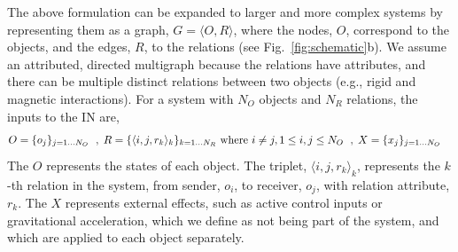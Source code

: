 \documentclass{article}
\newcommand{\NO}{N_O}
\newcommand{\NR}{N_R}
\begin{document}
The above formulation can be expanded to larger and more complex
systems by representing them as a graph, $G = \langle O,R \rangle$,
where the nodes, $O$, correspond to the objects, and the edges, $R$,
to the relations (see Fig.~\ref{fig:schematic}b). We assume an
attributed, directed multigraph because the relations have attributes,
and there can be multiple distinct relations between two objects
(e.g., rigid and magnetic interactions). For a system with $\NO$
objects and $\NR$ relations, the inputs to the IN are,
\begin{equation*}
\begin{aligned}[t]
  O &= \{o_j\}_{j=1\dots\NO}
\end{aligned}\hspace*{-4pt},\;
\begin{aligned}[t]
  R &= \{\langle i, j, r_k \rangle_k\}_{k=1\dots\NR} \mbox{ where } i
  \ne j, 1 \le i,j \le \NO
\end{aligned}\hspace*{-4pt},\;
\begin{aligned}[t]
  X &= \{x_j\}_{j=1\dots\NO}
\end{aligned}
\end{equation*}
The $O$ represents the states of each object. The triplet, $\langle i,
j, r_k \rangle_k$, represents the $k$-th relation in the system, from
sender, $o_i$, to receiver, $o_j$, with relation attribute, $r_k$. The
$X$ represents external effects, such as active control inputs or
gravitational acceleration, which we define as not being part of the
system, and which are applied to each object separately.
\end{document}
